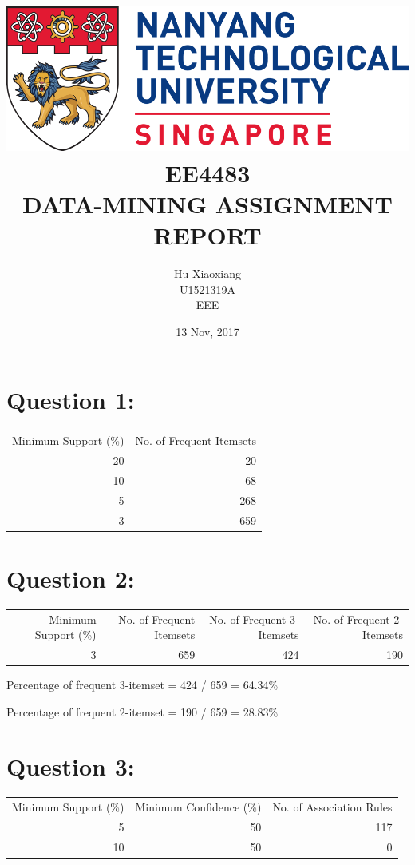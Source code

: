 \documentclass[titlepage]{article}
\author{Hu Xiaoxiang \\
U1521319A \\
EEE \\
}
\date{13 Nov, 2017 \\
}
\title{\includegraphics[width=\textwidth]{logo_ntu_new.png} \\
[5\baselineskip] EE4483 \\
DATA-MINING ASSIGNMENT \\
REPORT \\
[5\baselineskip]}
\begin{document}
\maketitle
\tableofcontents

\newpage
{}

\section{Question 1:}
\label{sec:org4455e74}
\begin{center}
\begin{tabular}{rr}
\hline
Minimum Support (\%) & No. of Frequent Itemsets\\
20 & 20\\
10 & 68\\
5 & 268\\
3 & 659\\
\hline
\end{tabular}
\end{center}

\section{Question 2:}
\label{sec:org1cd6dec}
\begin{center}
\begin{tabular}{rrrr}
\hline
Minimum Support (\%) & No. of Frequent Itemsets & No. of Frequent 3-Itemsets & No. of Frequent 2-Itemsets\\
3 & 659 & 424 & 190\\
\hline
\end{tabular}
\end{center}

Percentage of frequent 3-itemset = 424 / 659 = 64.34\%

Percentage of frequent 2-itemset = 190 / 659 = 28.83\%

\section{Question 3:}
\label{sec:orgdb1c511}
\begin{center}
\begin{tabular}{rrr}
\hline
Minimum Support (\%) & Minimum Confidence (\%) & No. of Association Rules\\
5 & 50 & 117\\
10 & 50 & 0\\
\hline
\end{tabular}
\end{center}
\end{document}
